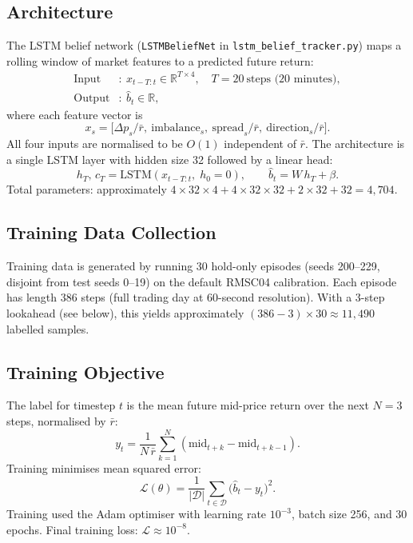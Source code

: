 \documentclass[11pt]{article}
\begin{document}
\subsection{Architecture}

The LSTM belief network (\texttt{LSTMBeliefNet} in \texttt{lstm\_belief\_tracker.py})
maps a rolling window of market features to a predicted future return:
\begin{align*}
\text{Input}  &:\ x_{t-T:t} \in \mathbb{R}^{T \times 4},
\quad T = 20\ \text{steps (20 minutes)},\\
\text{Output} &:\ \hat{b}_t \in \mathbb{R},
\end{align*}
where each feature vector is
\[
x_s = \bigl[\Delta p_s/\bar{r},\ \text{imbalance}_s,\ \text{spread}_s/\bar{r},\
             \text{direction}_s/\bar{r}\bigr].
\]
All four inputs are normalised to be $O(1)$ independent of $\bar{r}$.
The architecture is a single LSTM layer with hidden size 32 followed by a
linear head:
\[
h_T,\, c_T = \mathrm{LSTM}(x_{t-T:t},\; h_0 = 0),
\qquad
\hat{b}_t = W\,h_T + \beta.
\]
Total parameters: approximately $4 \times 32 \times 4 + 4 \times 32 \times 32
+ 2 \times 32 + 32 = 4{,}704$.

\subsection{Training Data Collection}

Training data is generated by running 30 hold-only episodes
(seeds 200--229, disjoint from test seeds 0--19) on the default
RMSC04 calibration.
Each episode has length 386 steps (full trading day at 60-second resolution).
With a 3-step lookahead (see below), this yields approximately
$(386 - 3) \times 30 \approx 11{,}490$ labelled samples.

\subsection{Training Objective}

The label for timestep $t$ is the mean future mid-price return over the
next $N=3$ steps, normalised by $\bar{r}$:
\[
y_t = \frac{1}{N\,\bar{r}}\sum_{k=1}^{N} (\text{mid}_{t+k} - \text{mid}_{t+k-1}).
\]
Training minimises mean squared error:
\[
\mathcal{L}(\theta) = \frac{1}{|\mathcal{D}|} \sum_{t \in \mathcal{D}}
  \bigl(\hat{b}_t - y_t\bigr)^2.
\]
Training used the Adam optimiser with learning rate $10^{-3}$, batch size 256,
and 30 epochs.
Final training loss: $\mathcal{L} \approx 10^{-8}$.
\end{document}
